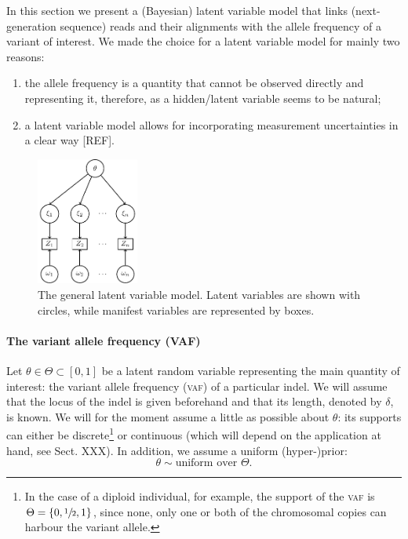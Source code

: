 \documentclass[12pt,a4paper]{article}
\numberwithin{equation}{section}
\begin{document}
In this section we present a (Bayesian) latent variable model that links (next-generation sequence) reads and their alignments with the allele frequency of a variant of interest. We made the choice for a latent variable model for mainly two reasons: 
\begin{enumerate}
	\item the allele frequency is a quantity that cannot be observed directly and representing it, therefore, as a hidden/latent variable seems to be natural; 
	\item a latent variable model allows for incorporating measurement uncertainties in a clear way [REF]. 
\end{enumerate}

\begin{figure}
	\centering
	\includegraphics[width=0.3\textwidth]{general_latent_variable_model.pdf}
	\caption{The general latent variable model. Latent variables are shown with circles, while manifest variables are represented by boxes. }
\end{figure}

\paragraph{The variant allele frequency (VAF)}

Let $\theta \in \Theta \subset [0,1]$ be a latent random variable representing the main quantity of interest: the variant allele frequency (\textsc{vaf}) of a particular indel. We will assume that the locus of the indel is given beforehand and that its length, denoted by $\delta$, is known. We will for the moment assume a little as possible about $\theta$: its supports can either be discrete\footnote{In the case of a diploid individual, for example, the support of the \textsc{vaf} is $\Theta = \{0, \sfrac{1}{2}, 1\}$, since none, only one or both of the chromosomal copies can harbour the variant allele.} or continuous (which will depend on the application at hand, see Sect. XXX). In addition, we assume a uniform (hyper-)prior: 
\begin{equation}
	\theta \sim \text{uniform over }\Theta.  
\end{equation}
\end{document}
